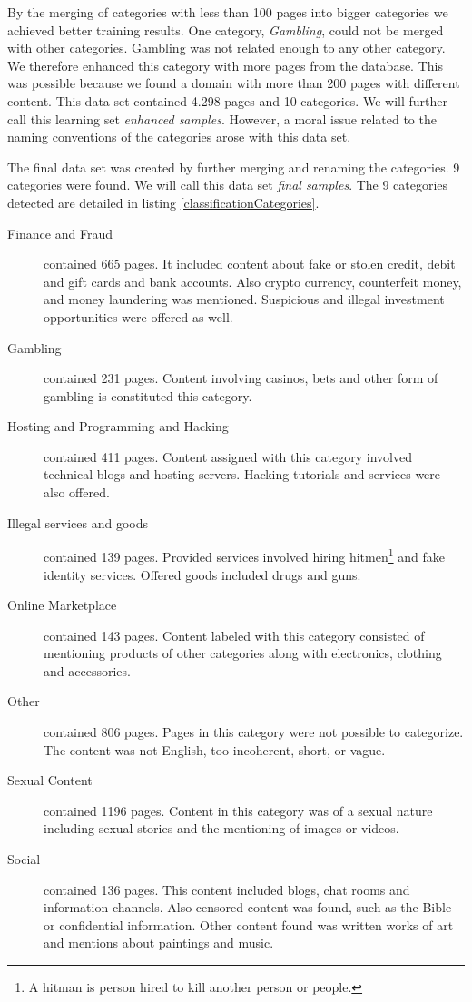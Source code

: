 By the merging of categories with less than 100 pages into bigger categories we achieved better training results. One category, \textit{Gambling}, could not be merged with other categories. Gambling was not related enough to any other category. We therefore enhanced this category with more pages from the database. This was possible because we found a domain with more than 200 pages with different content. This data set contained 4.298 pages and 10 categories. We will further call this learning set \textit{enhanced samples}. However, a moral issue related to the naming conventions of the categories arose with this data set. 

The final data set was created by further merging and renaming the categories. 9 categories were found. We will call this data set \textit{final samples}. The 9 categories detected are detailed in listing \ref{classificationCategories}.
 \label{classificationCategories}
\begin {description}
	\item[Finance and Fraud] contained 665 pages. It included content about fake or stolen credit, debit and gift cards and bank accounts. Also crypto currency, counterfeit money, and money laundering was mentioned. Suspicious and illegal investment opportunities were offered as well.
	\item[Gambling] contained 231 pages. Content involving casinos, bets and other form of gambling is constituted this category.
	\item[Hosting and Programming and Hacking] contained 411 pages. Content assigned with this category involved technical blogs and hosting servers. Hacking tutorials and services were also offered.
	\item[Illegal services and goods] contained 139 pages. Provided services involved hiring hitmen\footnote{A hitman is person hired to kill another person or people.} and fake identity services. Offered goods included drugs and guns.
	\item[Online Marketplace] contained 143 pages. Content labeled with this category consisted of mentioning products of other categories along with electronics, clothing and accessories. 
	\item[Other] contained 806 pages. Pages in this category were not possible to categorize. The content was not English, too incoherent, short, or vague. 
	\item[Sexual Content] contained 1196 pages. Content in this category was of a sexual nature including sexual stories and the mentioning of images or videos.
	\item[Social] contained 136 pages. This content included blogs, chat rooms and information channels. Also censored content was found, such as the Bible or confidential information. Other content found was written works of art and mentions about paintings and music. 
\end{description}

